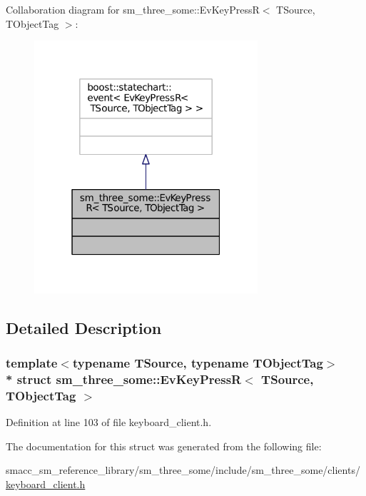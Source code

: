 Collaboration diagram for sm\+\_\+three\+\_\+some\+:\+:Ev\+Key\+PressR$<$ T\+Source, T\+Object\+Tag $>$\+:
\nopagebreak
\begin{figure}[H]
\begin{center}
\leavevmode
\includegraphics[width=235pt]{structsm__three__some_1_1EvKeyPressR__coll__graph}
\end{center}
\end{figure}


\subsection{Detailed Description}
\subsubsection*{template$<$typename T\+Source, typename T\+Object\+Tag$>$\\*
struct sm\+\_\+three\+\_\+some\+::\+Ev\+Key\+Press\+R$<$ T\+Source, T\+Object\+Tag $>$}



Definition at line 103 of file keyboard\+\_\+client.\+h.



The documentation for this struct was generated from the following file\+:\begin{DoxyCompactItemize}
\item 
smacc\+\_\+sm\+\_\+reference\+\_\+library/sm\+\_\+three\+\_\+some/include/sm\+\_\+three\+\_\+some/clients/\hyperlink{keyboard__client_8h}{keyboard\+\_\+client.\+h}\end{DoxyCompactItemize}
